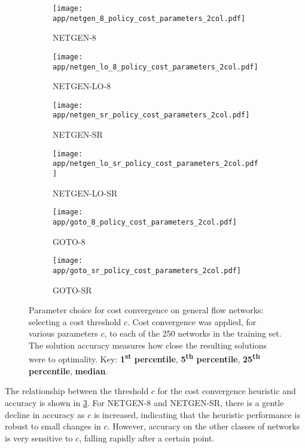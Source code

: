 \begin{figure}
    \begin{widepage}
        \begin{subfigure}[c]{0.5\textwidth}
            \texttt{[image: app/netgen\_8\_policy\_cost\_parameters\_2col.pdf]}
            \caption{NETGEN-8}
        \end{subfigure}
        \begin{subfigure}[c]{0.5\textwidth}
            \texttt{[image: app/netgen\_lo\_8\_policy\_cost\_parameters\_2col.pdf]}
            \caption{NETGEN-LO-8}
            \label{fig:app-general-cost-parameters:netgen-lo-8}
        \end{subfigure}
        \begin{subfigure}[c]{0.5\textwidth}
            \texttt{[image: app/netgen\_sr\_policy\_cost\_parameters\_2col.pdf]}
            \caption{NETGEN-SR}
        \end{subfigure}
        \begin{subfigure}[c]{0.5\textwidth}
            \texttt{[image: app/netgen\_lo\_sr\_policy\_cost\_parameters\_2col.pdf]}
            \caption{NETGEN-LO-SR}
            \label{fig:app-general-cost-parameters:netgen-lo-sr}
        \end{subfigure}
        \begin{subfigure}[c]{0.5\textwidth}
            \texttt{[image: app/goto\_8\_policy\_cost\_parameters\_2col.pdf]}
            \caption{GOTO-8}
        \end{subfigure}
        \begin{subfigure}[c]{0.5\textwidth}
            \texttt{[image: app/goto\_sr\_policy\_cost\_parameters\_2col.pdf]}
            \caption{GOTO-SR}
        \end{subfigure}
    \end{widepage}
    \caption[Parameter choice for cost convergence on general flow networks]{Parameter choice for cost convergence on general flow networks: selecting a cost threshold $c$. Cost convergence was applied, for various parameters $c$, to each of the 250 networks in the training set. The solution accuracy measures how close the resulting solutions were to optimality. Key: \textbf{\color{matplotlib_blue} 1\textsuperscript{st} percentile}, \textbf{\color{matplotlib_green} 5\textsuperscript{th} percentile}, \textbf{\color{matplotlib_red} 25\textsuperscript{th} percentile}, \textbf{\color{matplotlib_cyan} median}.}
    \label{fig:app-general-cost-parameters}
\end{figure}

The relationship between the threshold $c$ for the cost convergence heuristic and accuracy is shown in \cref{fig:app-general-cost-parameters}. For NETGEN-8 and NETGEN-SR, there is a gentle decline in accuracy as $c$ is increased, indicating that the heuristic performance is robust to small changes in $c$. However, accuracy on the other classes of networks is very sensitive to $c$, falling rapidly after a certain point.

